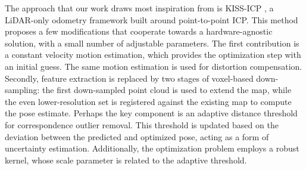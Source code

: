The approach that our work draws most inspiration from is KISS-ICP \cite{vizzo2023ral}, a LiDAR-only odometry framework built around point-to-point ICP. This method proposes a few modifications that cooperate towards a hardware-agnostic solution, with a small number of adjustable parameters. The first contribution is a constant velocity motion estimation, which provides the optimization step with an initial guess. The same motion estimation is used for distortion compensation. Secondly, feature extraction is replaced by two stages of voxel-based down-sampling: the first down-sampled point cloud is used to extend the map, while the even lower-resolution set is registered against the existing map to compute the pose estimate. Perhaps the key component is an adaptive distance threshold for correspondence outlier removal. This threshold is updated based on the deviation between the predicted and optimized pose, acting as a form of uncertainty estimation. Additionally, the optimization problem employs a robust kernel, whose scale parameter is related to the adaptive threshold.

